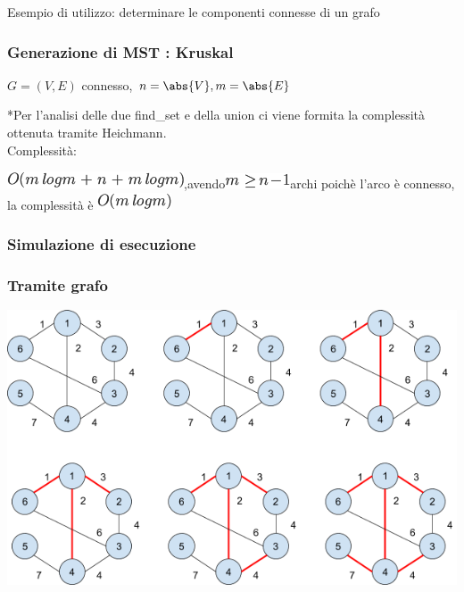 \documentclass{article}
\begin{document}
{{{{Esempio di utilizzo: determinare le componenti connesse di un grafo}

\protect\hypertarget{t.9ae6642cabb7dfeda3c5292f67bce18bb08a8c38}{}{}\protect\hypertarget{t.41}{}{}



\hypertarget{h.tpoo55sx1m98}{\subsubsection{\texorpdfstring{{Generazione
di MST : Kruskal}}{Generazione di MST : Kruskal}}\label{h.tpoo55sx1m98}}

$G=(V,E)$ connesso, $n=\abs{V},m=\abs{E}$

\protect\hypertarget{t.4b86b9e72214bfde6e44300f060a45f33bae59c6}{}{}\protect\hypertarget{t.42}{}{}



{*Per l'analisi delle due find\_set e della union ci viene formita la
complessità ottenuta tramite Heichmann.\\
}{Complessità}{:}

\includegraphics{images/image482.png}{,avendo}\includegraphics{images/image483.png}{archi poichè l'arco è connesso, la complessità è }\includegraphics{images/image484.png}

\hypertarget{h.4n5zx1ni4b2b}{\subsubsection{\texorpdfstring{{Simulazione
di esecuzione}}{Simulazione di esecuzione}}\label{h.4n5zx1ni4b2b}}

\subsubsection{Tramite grafo}

{\includegraphics{images/image519.png}}

}}}
\end{document}
